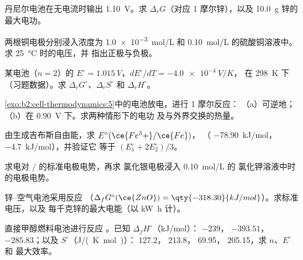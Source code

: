 \begin{exercise}[$\star$]\label{exo:b2:cell-thermodynamics:3}
丹尼尔电池在无电流时输出 \qty{1.10}{V}。求 $\Delta_r G$（对应
1 摩尔锌），以及 \qty{10.0}{g} 锌的最大电功。
\end{exercise}

\begin{exercise}[$\star$]\label{exo:b2:cell-thermodynamics:4}
两根铜电极分别浸入浓度为 \qty{1.0e-3}{mol/L}
和 \qty{0.10}{mol/L} 的硫酸铜溶液中。求 \qty{25}{\degreeCelsius} 时的电压，并
指出正极与负极。
\end{exercise}

\begin{exercise}[$\star\star$]\label{exo:b2:cell-thermodynamics:5}
某电池（$n = 2$）的 $E^\circ = \qty{1.015}{V}$，$dE^\circ/dT = \qty{-4.0e-4}{V/K}$，
在 \qty{298}{K} 下（习题数据）。求 $\Delta_r G^\circ$、$\Delta_r S^\circ$ 和
$\Delta_r H^\circ$。
\end{exercise}

\begin{exercise}[$\star\star$]\label{exo:b2:cell-thermodynamics:6}
\cref{exo:b2:cell-thermodynamics:5}中的电池放电，进行 1 摩尔反应：
（a）可逆地；（b）在 \qty{0.90}{V} 下。求两种情形下的电功
及与外界交换的热量。
\end{exercise}

\begin{exercise}[$\star\star$]\label{exo:b2:cell-thermodynamics:7}
由生成吉布斯自由能，求 $E^\circ(\ce{Fe^3+}/\ce{Fe})$，
（ \qty{-78.90}{kJ/mol}， \qty{-4.7}{kJ/mol}），并验证它
等于 $(E_1^\circ + 2E_2^\circ)/3$。
\end{exercise}

\begin{exercise}[$\star\star$]\label{exo:b2:cell-thermodynamics:8}
求电对 / 的标准电极电势，再求
氯化银电极浸入 \qty{0.10}{mol/L} 的
氯化钾溶液中时的电极电势。
\end{exercise}

\begin{exercise}[$\star\star$]\label{exo:b2:cell-thermodynamics:9}
锌–空气电池采用反应 （$\Delta_f G^\circ(\ce{ZnO}) =
\qty{-318.30}{kJ/mol}$）。求标准电压，以及
每千克锌的最大电能（以 \unit{kW.h} 计）。
\end{exercise}

\begin{exercise}[$\star\star\star$]\label{exo:b2:cell-thermodynamics:10}
直接甲醇燃料电池进行反应 。已知
$\Delta_f H^\circ$（\unit{kJ/mol}）： $-239$， $-393.51$，
 $-285.83$；以及 $S^\circ$（\unit{J/(K.mol)}）： 127.2，
 213.8， 69.95， 205.15，求 $n$、$E^\circ$ 和
最大效率。
\end{exercise}

